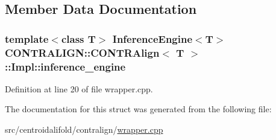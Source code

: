 \subsection{Member Data Documentation}
\hypertarget{struct_c_o_n_t_r_a_l_i_g_n_1_1_c_o_n_t_r_align_1_1_impl_a57c43c920a6541fd5c37c78bed27881a}{
\subsubsection[{inference\+\_\+engine}]{\setlength{\rightskip}{0pt plus 5cm}template$<$class T$>$ {\bf Inference\+Engine}$<$T$>$ {\bf C\+O\+N\+T\+R\+A\+L\+I\+G\+N\+::\+C\+O\+N\+T\+R\+Align}$<$ T $>$\+::Impl\+::inference\+\_\+engine}}\label{struct_c_o_n_t_r_a_l_i_g_n_1_1_c_o_n_t_r_align_1_1_impl_a57c43c920a6541fd5c37c78bed27881a}


Definition at line 20 of file wrapper.\+cpp.



The documentation for this struct was generated from the following file\+:\begin{DoxyCompactItemize}
\item 
src/centroidalifold/contralign/\hyperlink{contralign_2wrapper_8cpp}{wrapper.\+cpp}\end{DoxyCompactItemize}
